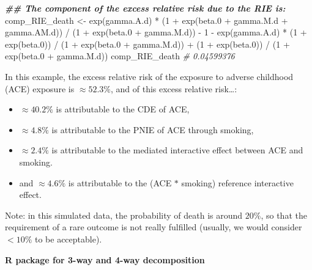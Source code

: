 \documentclass[
]{book}
\newenvironment{Shaded}{\begin{snugshade}}{\end{snugshade}}
\newcommand{\CommentTok}[1]{\textcolor[rgb]{0.56,0.35,0.01}{\textit{#1}}}
\newcommand{\DecValTok}[1]{\textcolor[rgb]{0.00,0.00,0.81}{#1}}
\newcommand{\DocumentationTok}[1]{\textcolor[rgb]{0.56,0.35,0.01}{\textbf{\textit{#1}}}}
\newcommand{\FloatTok}[1]{\textcolor[rgb]{0.00,0.00,0.81}{#1}}
\newcommand{\FunctionTok}[1]{\textcolor[rgb]{0.00,0.00,0.00}{#1}}
\newcommand{\NormalTok}[1]{#1}
\newcommand{\OtherTok}[1]{\textcolor[rgb]{0.56,0.35,0.01}{#1}}
\newcommand{\SpecialCharTok}[1]{\textcolor[rgb]{0.00,0.00,0.00}{#1}}
\providecommand{\tightlist}{%
  \setlength{\itemsep}{0pt}\setlength{\parskip}{0pt}}
\begin{document}
\begin{Shaded}
\begin{Highlighting}[]
\DocumentationTok{\#\# The component of the excess relative risk due to the RIE is:}
\NormalTok{comp\_RIE\_death }\OtherTok{\textless{}{-}} \FunctionTok{exp}\NormalTok{(gamma.A.d) }\SpecialCharTok{*}\NormalTok{ (}\DecValTok{1} \SpecialCharTok{+} \FunctionTok{exp}\NormalTok{(beta}\FloatTok{.0} \SpecialCharTok{+}\NormalTok{ gamma.M.d }\SpecialCharTok{+}\NormalTok{ gamma.AM.d)) }\SpecialCharTok{/}
\NormalTok{  (}\DecValTok{1} \SpecialCharTok{+} \FunctionTok{exp}\NormalTok{(beta}\FloatTok{.0} \SpecialCharTok{+}\NormalTok{ gamma.M.d)) }\SpecialCharTok{{-}} \DecValTok{1} \SpecialCharTok{{-}}
  \FunctionTok{exp}\NormalTok{(gamma.A.d) }\SpecialCharTok{*}\NormalTok{ (}\DecValTok{1} \SpecialCharTok{+} \FunctionTok{exp}\NormalTok{(beta}\FloatTok{.0}\NormalTok{)) }\SpecialCharTok{/}\NormalTok{ (}\DecValTok{1} \SpecialCharTok{+} \FunctionTok{exp}\NormalTok{(beta}\FloatTok{.0} \SpecialCharTok{+}\NormalTok{ gamma.M.d)) }\SpecialCharTok{+}
\NormalTok{  (}\DecValTok{1} \SpecialCharTok{+} \FunctionTok{exp}\NormalTok{(beta}\FloatTok{.0}\NormalTok{)) }\SpecialCharTok{/}\NormalTok{ (}\DecValTok{1} \SpecialCharTok{+} \FunctionTok{exp}\NormalTok{(beta}\FloatTok{.0} \SpecialCharTok{+}\NormalTok{ gamma.M.d))}
\NormalTok{comp\_RIE\_death}
\CommentTok{\# 0.04599376}
\end{Highlighting}
\end{Shaded}

In this example, the excess relative risk of the exposure to adverse childhood (ACE) exposure is \(\approx 52.3\%\), and of this excess relative risk\ldots:

\begin{itemize}
\tightlist
\item
  \(\approx 40.2\%\) is attributable to the CDE of ACE,
\item
  \(\approx 4.8\%\) is attributable to the PNIE of ACE through smoking,
\item
  \(\approx 2.4\%\) is attributable to the mediated interactive effect between ACE and smoking.
\item
  and \(\approx 4.6\%\) is attributable to the (ACE \(\ast\) smoking) reference interactive effect.
\end{itemize}

Note: in this simulated data, the probability of death is around \(20\%\), so that the requirement of a rare outcome is not really fulfilled (usually, we would consider \(< 10\%\) to be acceptable).

\textbf{R package for 3-way and 4-way decomposition}
\end{document}
